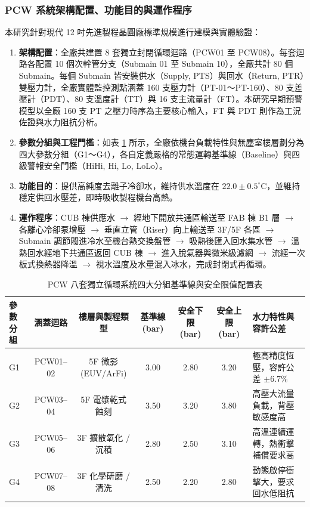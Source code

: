 \documentclass[fontset=none, a4paper, 12pt]{ctexart}
\begin{document}
\subsubsection{PCW 系統架構配置、功能目的與運作程序}
本研究針對現代 12 吋先進製程晶圓廠標準規模進行建模與實體驗證：
\begin{enumerate}
    \item \textbf{架構配置}：全廠共建置 8 套獨立封閉循環迴路（PCW01 至 PCW08）。每套迴路各配置 10 個次幹管分支（Submain 01 至 Submain 10），全廠共計 80 個 Submain。每個 Submain 皆安裝供水（Supply, PTS）與回水（Return, PTR）雙壓力計，全廠實體監控測點涵蓋 160 支壓力計（PT-01～PT-160）、80 支差壓計（PDT）、80 支溫度計（TT）與 16 支主流量計（FT）。本研究早期預警模型以全廠 160 支 PT 之壓力時序為主要核心輸入，FT 與 PDT 則作為工況佐證與水力阻抗分析。
    \item \textbf{參數分組與工程門檻}：如表 \ref{tab:pcw_parameter_groups} 所示，全廠依機台負載特性與無塵室樓層劃分為四大參數分組（G1～G4），各自定義嚴格的常態運轉基準線（Baseline）與四級警報安全門檻（HiHi, Hi, Lo, LoLo）。
    \item \textbf{功能目的}：提供高純度去離子冷卻水，維持供水溫度在 $22.0 \pm 0.5^\circ\text{C}$，並維持穩定供回水壓差，即時吸收製程機台高熱。
    \item \textbf{運作程序}：CUB 棟供應水 $\to$ 經地下開放共通區輸送至 FAB 棟 B1 層 $\to$ 各離心冷卻泵增壓 $\to$ 垂直立管（Riser）向上輸送至 3F/5F 各區 $\to$ Submain 調節閥進冷水至機台熱交換盤管 $\to$ 吸熱後匯入回水集水管 $\to$ 溫熱回水經地下共通區返回 CUB 棟 $\to$ 進入脫氣器與微米級濾網 $\to$ 流經一次板式換熱器降溫 $\to$ 視水溫度及水量混入冰水，完成封閉式再循環。
\end{enumerate}

\begin{table}[H]
    \centering
    \caption{PCW 八套獨立循環系統四大分組基準線與安全限值配置表}
    \label{tab:pcw_parameter_groups}
    \small
    \begin{tabularx}{\textwidth}{lcccccX}
        \toprule
        \textbf{參數分組} & \textbf{涵蓋迴路} & \textbf{樓層與製程類型} & \textbf{基準線 (bar)} & \textbf{安全下限 (bar)} & \textbf{安全上限 (bar)} & \textbf{水力特性與容許公差} \\
        \midrule
        G1 & PCW01--02 & 5F 微影 (EUV/ArFi) & 3.00 & 2.80 & 3.20 & 極高精度恆壓，容許公差 $\pm 6.7\%$ \\
        G2 & PCW03--04 & 5F 電漿乾式蝕刻 & 3.50 & 3.20 & 3.80 & 高壓大流量負載，背壓敏感度高 \\
        G3 & PCW05--06 & 3F 擴散氧化 / 沉積 & 2.80 & 2.50 & 3.10 & 高溫連續運轉，熱衝擊補償要求高 \\
        G4 & PCW07--08 & 3F 化學研磨 / 清洗 & 2.50 & 2.20 & 2.80 & 動態啟停衝擊大，要求回水低阻抗 \\
        \bottomrule
    \end{tabularx}
\end{table}
\end{document}
